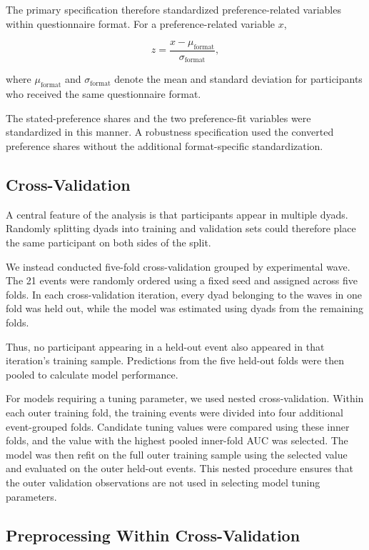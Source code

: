 \documentclass[11pt,letterpaper,reqno]{amsart}
\numberwithin{equation}{subsection}
\theoremstyle{definition}
\numberwithin{thm}{subsection}
\begin{document}
The primary specification therefore standardized preference-related variables within questionnaire format. For a preference-related variable $x$,

\begin{equation}
z
=
\frac{
x-\mu_{\text{format}}
}{
\sigma_{\text{format}}
},
\end{equation}

where $\mu_{\text{format}}$ and $\sigma_{\text{format}}$ denote the mean and standard deviation for participants who received the same questionnaire format.

The stated-preference shares and the two preference-fit variables were standardized in this manner. A robustness specification used the converted preference shares without the additional format-specific standardization.

\subsection{Cross-Validation}

A central feature of the analysis is that participants appear in multiple dyads. Randomly splitting dyads into training and validation sets could therefore place the same participant on both sides of the split.

We instead conducted five-fold cross-validation grouped by experimental wave. The 21 events were randomly ordered using a fixed seed and assigned across five folds. In each cross-validation iteration, every dyad belonging to the waves in one fold was held out, while the model was estimated using dyads from the remaining folds.

Thus, no participant appearing in a held-out event also appeared in that iteration's training sample. Predictions from the five held-out folds were then pooled to calculate model performance.

For models requiring a tuning parameter, we used nested cross-validation. Within each outer training fold, the training events were divided into four additional event-grouped folds. Candidate tuning values were compared using these inner folds, and the value with the highest pooled inner-fold AUC was selected. The model was then refit on the full outer training sample using the selected value and evaluated on the outer held-out events. This nested procedure ensures that the outer validation observations are not used in selecting model tuning parameters.

\subsection{Preprocessing Within Cross-Validation}
\end{document}
